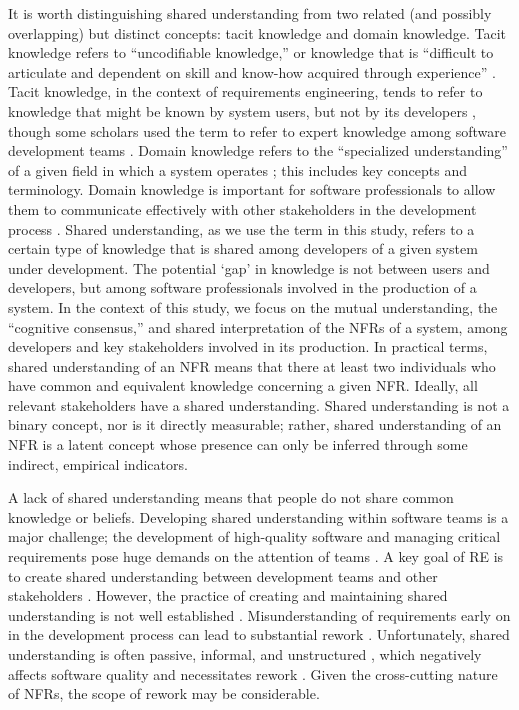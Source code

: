 \documentclass[smallextended]{svjour3}        %
\begin{document}
It is worth distinguishing shared understanding from two related (and possibly overlapping) but distinct concepts: tacit knowledge and domain knowledge. Tacit knowledge refers to ``uncodifiable knowledge,'' or knowledge that is ``difficult to articulate and dependent on skill and know-how
acquired through experience'' \citep{gacitua2009making}. 
Tacit knowledge, in the context of requirements engineering, tends to refer to knowledge that might be known by system users, but not by its developers \citep{sporsem2023refsq,niknafs2017impact}, though some scholars used the term to refer to expert knowledge among software development teams \citep{ryan2009development,ryan2013acquiring}.
Domain knowledge refers to the ``specialized understanding'' of a given field in which a system operates \citep{araujo2025domain}; this includes key concepts and terminology. Domain knowledge is important for software professionals to allow them to communicate effectively with other stakeholders in the development process \citep{ryan2013acquiring}.
Shared understanding, as we use the term in this study, refers to a certain type of knowledge that is shared among developers of a given system under development. The potential `gap' in knowledge is not between users and developers, but among software professionals involved in the production of a system. 
In the context of this study, we focus on the mutual understanding, the ``cognitive consensus,'' and shared interpretation of the NFRs of a system, among developers and key stakeholders involved in its production. 
In practical terms, shared understanding of an NFR means that there at least two individuals who have common and equivalent knowledge concerning a given NFR. Ideally, all relevant stakeholders have a shared understanding. Shared understanding is not a binary concept, nor is it directly measurable; rather, shared understanding of an NFR is a latent concept whose presence can only be inferred through some indirect, empirical indicators.



A lack of shared understanding means that people do not share common knowledge or beliefs. 
Developing shared understanding within software teams is a major challenge; the development of high-quality software and managing critical requirements pose huge demands on the attention of teams \citep{hoffmann2013emergence,corvera2013emergence}.
A key goal of RE is to create shared understanding between development teams and other stakeholders \citep{fricker2015requirements}. However,  the practice of creating and maintaining shared understanding is not well established \citep{schon_agile_2017}.
Misunderstanding of requirements early on in the development process can lead to substantial rework \citep{bjarnason2011case}.
Unfortunately, shared understanding is often passive, informal, and unstructured \citep{glinz_shared_2015}, which negatively affects software quality and necessitates rework \citep{damiantse2006}. Given the cross-cutting nature of NFRs, the scope of rework may be considerable.
\end{document}
